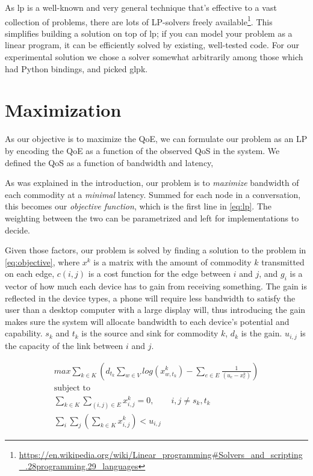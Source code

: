 As \gls{lp} is a well-known and very general technique that's effective to a vast collection of problems, there are lots of LP-solvers freely available\footnote{\url{https://en.wikipedia.org/wiki/Linear_programming\#Solvers_and_scripting_.28programming.29_languages}}. This simplifies building a solution on top of \gls{lp}; if you can model your problem as a linear program, it can be efficiently solved by existing, well-tested code. For our experimental solution we chose a solver somewhat arbitrarily among those which had Python bindings, and picked \gls{glpk}.


\section{Maximization}

As our objective is to maximize the QoE, we can formulate our problem as an LP by encoding the QoE as a function of the observed QoS in the system. We defined the QoS as a function of bandwidth and latency,

As was explained in the introduction, our problem is to \emph{maximize} bandwidth of each commodity at a \emph{minimal} latency. Summed for each node in a conversation, this becomes our \emph{objective function}, which is the first line in \autoref{eq:lp}. The weighting between the two can be parametrized and left for implementations to decide.

Given those factors, our problem is solved by finding a solution to the problem in \autoref{eq:objective}, where $x^k$ is a matrix with the amount of commodity $k$ transmitted on each edge, $c(i, j)$ is a cost function for the edge between $i$ and $j$, and $g_i$ is a vector of how much each device has to gain from receiving something. The gain is reflected in the device types, a phone will require less bandwidth to satisfy the user than a desktop computer with a large display will, thus introducing the gain makes sure the system will allocate bandwidth to each device's potential and capability. $s_k$ and $t_k$ is the source and sink for commodity $k$, $d_k$ is the gain. $u_{i, j}$ is the capacity of the link between $i$ and $j$.

\begin{gather}\label{eq:objective}
    max \sum_{k \in K} (d_{t_k} \sum_{w \in V} log(x_{w, t_k}^k) - \sum_{e \in E} \frac{1}{(u_e - x_e^k)})\\
    \text{subject to} \nonumber \\
    \sum_{k \in K} \sum_{(i, j) \in E} x_{i, j}^k = 0, \qquad{} i, j \neq s_k, t_k \label{eq:flow-conservation} \\
    \sum_i \sum_j (\sum_{k \in K}x_{i, j}^k) < u_{i, j} \label{eq:bwlim}
\end{gather}


